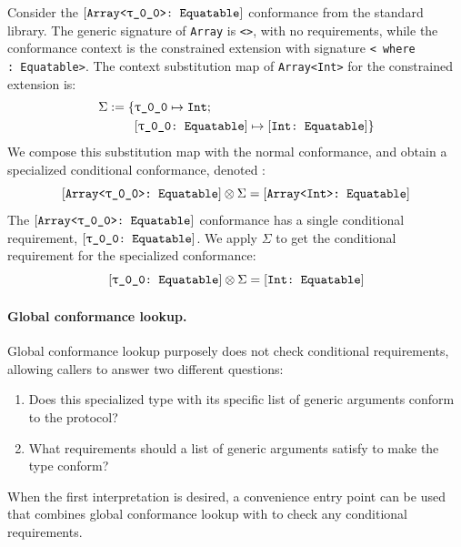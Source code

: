 \documentclass[../generics]{subfiles}
\begin{document}
Consider the $\ConfReq{Array<\rT>}{Equatable}$ conformance from the standard library. The generic signature of \texttt{Array} is \texttt{<\rT>}, with no requirements, while the conformance context is the constrained extension with signature \texttt{<\rT\ where \rT:~Equatable>}. The context substitution map of \texttt{Array<Int>} for the constrained extension is:
\begin{align*}
\Sigma := \SubstMapC{
&\SubstType{\rT}{Int}}{
\\
&\SubstConf{\rT}{Int}{Equatable}}
\end{align*}
We compose this substitution map with the normal conformance, and obtain a specialized conditional conformance, denoted :
\[
\ConfReq{Array<\rT>}{Equatable} \otimes \Sigma = \ConfReq{Array<Int>}{Equatable}
\]
The $\ConfReq{Array<\rT>}{Equatable}$ conformance has a single conditional requirement, $\ConfReq{\rT}{Equatable}$. We apply $\Sigma$ to get the conditional requirement for the specialized conformance:
\[
\ConfReq{\rT}{Equatable} \otimes \Sigma = \ConfReq{Int}{Equatable}
\]

\paragraph{Global conformance lookup.}
Global conformance lookup purposely does not check conditional requirements, allowing callers to answer two different questions:
\begin{enumerate}
\item Does this specialized type with its specific list of generic arguments conform to the protocol?
\item What requirements should a list of generic arguments satisfy to make the type conform?
\end{enumerate}
When the first interpretation is desired, a convenience entry point can be used that combines global conformance lookup with  to check any conditional requirements.
\end{document}
